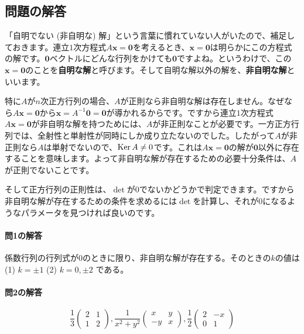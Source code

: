 \subsection{問題の解答} \label{subsection:non-trivial_answer}

「自明でない (非自明な) 解」という言葉に慣れていない人がいたので、補足しておきます。連立$1$次方程式$A\bm{x} = \bm{0}$を考えるとき、$\bm{x} = \bm{0}$は明らかにこの方程式の解です。$\bm{0}$ベクトルにどんな行列をかけても$\bm{0}$ですよね。というわけで、この$\bm{x} = \bm{0}$のことを\textbf{自明な解}と呼びます。そして自明な解以外の解を、\textbf{非自明な解}といいます。

特に$A$が$n$次正方行列の場合、$A$が正則なら非自明な解は存在しません。なぜなら$A\bm{x} = \bm{0}$から$\bm{x} = A^{-1}\bm{0} = \bm{0}$が導かれるからです。ですから連立$1$次方程式$A\bm{x} = \bm{0}$が非自明な解を持つためには、$A$が非正則なことが必要です。一方正方行列では、全射性と単射性が同時にしか成り立たないのでした。したがって$A$が非正則なら$A$は単射でないので、$\operatorname{Ker} A \neq 0$です。これは$A\bm{x} = \bm{0}$の解が$\bm{0}$以外に存在することを意味します。よって非自明な解が存在するための必要十分条件は、$A$が正則でないことです。

そして正方行列の正則性は、$\det$が$0$でないかどうかで判定できます。ですから非自明な解が存在するための条件を求めるには$\det$を計算し、それが$0$になるようなパラメータを見つければ良いのです。

\paragraph{問1の解答}
係数行列の行列式が$0$のときに限り、非自明な解が存在する。そのときの$k$の値は (1) $k = \pm1$ (2) $k = 0, \pm2$ である。

\paragraph{問2の解答}

\[
\frac{1}{3}
\begin{pmatrix}
2 & 1 \\
1 & 2
\end{pmatrix}, 
\frac{1}{x^2 + y^2}
\begin{pmatrix}
x & y \\
-y & x
\end{pmatrix}, 
\frac{1}{2}
\begin{pmatrix}
2 & -x \\
0 & 1
\end{pmatrix}
\]

